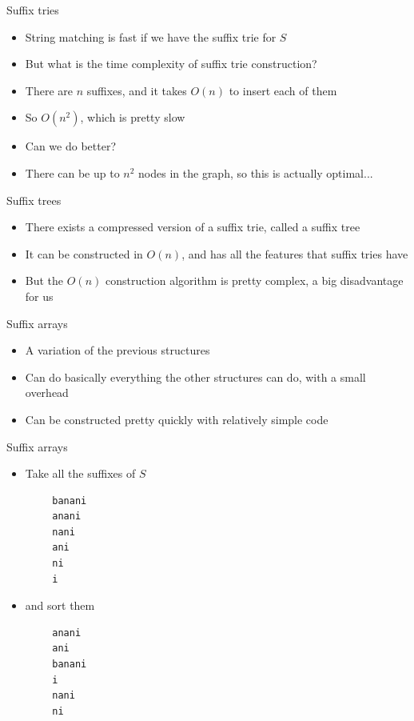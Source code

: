 \documentclass{beamer}
\begin{document}
\begin{frame}{Suffix tries}
	\begin{itemize}
		\item String matching is fast if we have the suffix trie for $S$
		\vspace{10pt}
		\item But what is the time complexity of suffix trie construction?
		\item There are $n$ suffixes, and it takes $O(n)$ to insert each of them
		\item So $O(n^2)$, which is pretty slow
		\vspace{10pt}
		\item Can we do better?
		\item There can be up to $n^2$ nodes in the graph, so this is actually optimal...
	\end{itemize}
\end{frame}

\begin{frame}{Suffix trees}
	\begin{itemize}
		\item There exists a compressed version of a suffix trie, called a suffix tree
		\vspace{10pt}
		\item It can be constructed in $O(n)$, and has all the features that suffix tries have
		\item But the $O(n)$ construction algorithm is pretty complex, a big disadvantage for us
	\end{itemize}
\end{frame}

\begin{frame}{Suffix arrays}
	\begin{itemize}
		\item A variation of the previous structures
		\item Can do basically everything the other structures can do, with a small overhead
		\item Can be constructed pretty quickly with relatively simple code
	\end{itemize}
\end{frame}

\begin{frame}[fragile]{Suffix arrays}
	\begin{itemize}
		\item Take all the suffixes of $S$
	\end{itemize}
	\begin{verbatim}
		banani
		anani
		nani
		ani
		ni
		i
	\end{verbatim}
	\begin{itemize}
		\item and sort them
	\end{itemize}
	\begin{verbatim}
		anani
		ani
		banani
		i
		nani
		ni
	\end{verbatim}
	
\end{frame}
\end{document}
